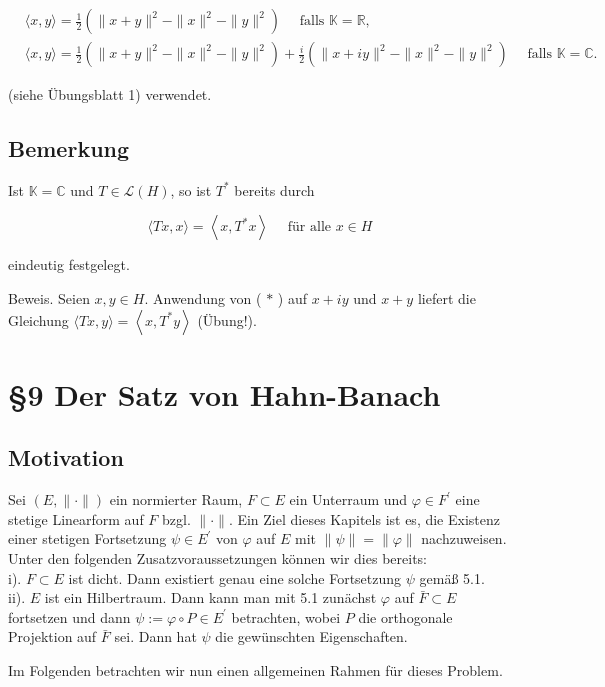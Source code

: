 \documentclass[10pt, letterpaper]{article}
\begin{document}
$$
\begin{aligned}
& \langle x, y\rangle=\frac{1}{2}\left(\|x+y\|^{2}-\|x\|^{2}-\|y\|^{2}\right) \quad \text { falls } \mathbb{K}=\mathbb{R}, \\
& \langle x, y\rangle=\frac{1}{2}\left(\|x+y\|^{2}-\|x\|^{2}-\|y\|^{2}\right)+\frac{i}{2}\left(\|x+i y\|^{2}-\|x\|^{2}-\|y\|^{2}\right) \quad \text { falls } \mathbb{K}=\mathbb{C} .
\end{aligned}
$$

(siehe Übungsblatt 1) verwendet.

\subsection*{Bemerkung}
Ist $\mathbb{K}=\mathbb{C}$ und $T \in \mathcal{L}(H)$, so ist $T^{*}$ bereits durch

$$
\langle T x, x\rangle=\left\langle x, T^{*} x\right\rangle \quad \text { für alle } x \in H
$$

eindeutig festgelegt.

Beweis. Seien $x, y \in H$. Anwendung von ( $*$ ) auf $x+i y$ und $x+y$ liefert die Gleichung $\langle T x, y\rangle=\left\langle x, T^{*} y\right\rangle$ (Übung!).

\section*{§9 Der Satz von Hahn-Banach}
\subsection*{Motivation}
Sei $(E,\|\cdot\|)$ ein normierter Raum, $F \subset E$ ein Unterraum und $\varphi \in F^{\prime}$ eine stetige Linearform auf $F$ bzgl. $\|\cdot\|$. Ein Ziel dieses Kapitels ist es, die Existenz einer stetigen Fortsetzung $\psi \in E^{\prime}$ von $\varphi$ auf $E$ mit $\|\psi\|=\|\varphi\|$ nachzuweisen. Unter den folgenden Zusatzvoraussetzungen können wir dies bereits:\\
i). $F \subset E$ ist dicht. Dann existiert genau eine solche Fortsetzung $\psi$ gemäß 5.1.\\
ii). $E$ ist ein Hilbertraum. Dann kann man mit 5.1 zunächst $\varphi$ auf $\bar{F} \subset E$ fortsetzen und dann $\psi:=\varphi \circ P \in E^{\prime}$ betrachten, wobei $P$ die orthogonale Projektion auf $\bar{F}$ sei. Dann hat $\psi$ die gewünschten Eigenschaften.

Im Folgenden betrachten wir nun einen allgemeinen Rahmen für dieses Problem.
\end{document}

